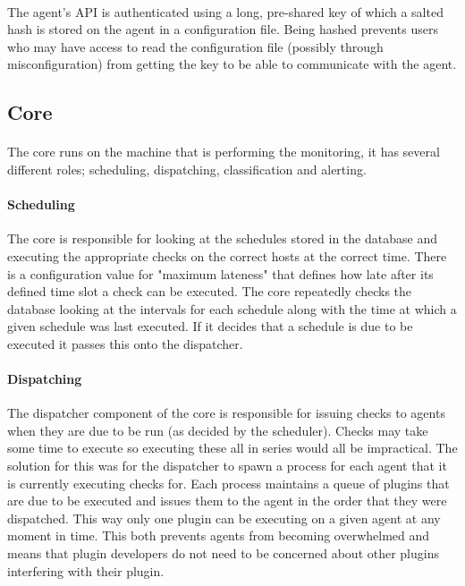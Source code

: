 \documentclass[bsc,logo,twoside]{infthesis}
\begin{document}
\paragraph*{}
	The agent's API is authenticated using a long, pre-shared key of which a salted
	hash is stored on the agent in a configuration file.  Being hashed prevents
	users who may have access to read the configuration file (possibly through
	misconfiguration) from getting the key to be able to communicate with the agent.
	
\subsection{Core}
\paragraph*{}
	The core runs on the machine that is performing the monitoring, it has several
	different roles; scheduling, dispatching, classification and alerting.
	
\paragraph*{Scheduling}
	The core is responsible for looking at the schedules stored in the database and
	executing the appropriate checks on the correct hosts at the correct time. There
	is a configuration value for "maximum lateness" that defines how late after its
	defined time slot a check can be executed.  The core repeatedly checks the
	database looking at the intervals for each schedule along with the time at which
	a given schedule was last executed.  If it decides that a schedule is due to be
	executed it passes this onto the dispatcher.
	
\paragraph*{Dispatching}
	The dispatcher component of the core is responsible for issuing checks to agents
	when they are due to be run (as decided by the scheduler).  Checks may take some
	time to execute so executing these all in series would all be impractical. The
	solution for this was for the dispatcher to spawn a process for each agent that
	it is currently executing checks for.  Each process maintains a queue of plugins
	that are due to be executed and issues them to the agent in the order that they
	were dispatched.  This way only one plugin can be executing on a given agent at
	any moment in time.  This both prevents agents from becoming overwhelmed and
	means that plugin developers do not need to be concerned about other plugins
	interfering with their plugin.
	
\end{document}
